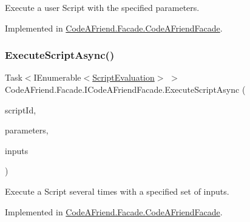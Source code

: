 Execute a user Script with the specified parameters.



Implemented in \mbox{\hyperlink{class_code_a_friend_1_1_facade_1_1_code_a_friend_facade_a04883cd14eb596a9f9113c24aa06e34b}{Code\+A\+Friend.\+Facade.\+Code\+A\+Friend\+Facade}}.

\mbox{\label{interface_code_a_friend_1_1_facade_1_1_i_code_a_friend_facade_a7a3f1a746d41872d14197a8949781ce2}} 
\subsubsection{\texorpdfstring{Execute\+Script\+Async()}{ExecuteScriptAsync()}\hspace{0.1cm}{\footnotesize\ttfamily [2/2]}}
{\footnotesize\ttfamily Task$<$I\+Enumerable$<$\mbox{\hyperlink{class_code_a_friend_1_1_data_model_1_1_script_evaluation}{Script\+Evaluation}}$>$ $>$ Code\+A\+Friend.\+Facade.\+I\+Code\+A\+Friend\+Facade.\+Execute\+Script\+Async (\begin{DoxyParamCaption}\item[{Guid}]{script\+Id,  }\item[{\mbox{\hyperlink{class_code_a_friend_1_1_data_model_1_1_execution_parameters}{Execution\+Parameters}}}]{parameters,  }\item[{params string \mbox{[}$\,$\mbox{]}}]{inputs }\end{DoxyParamCaption})}



Execute a Script several times with a specified set of inputs.



Implemented in \mbox{\hyperlink{class_code_a_friend_1_1_facade_1_1_code_a_friend_facade_abcd7e13b8e5a7accbcd56b4f7eee8934}{Code\+A\+Friend.\+Facade.\+Code\+A\+Friend\+Facade}}.

\mbox{\label{interface_code_a_friend_1_1_facade_1_1_i_code_a_friend_facade_a044ae5a5e7d55904f0fd43eca50650cb}} 
